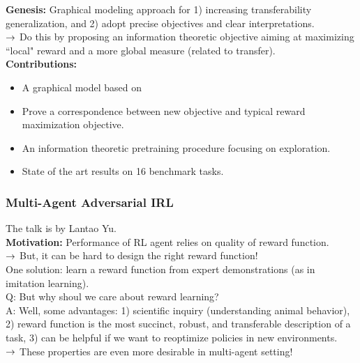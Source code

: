 {\bf Genesis:} Graphical modeling approach for 1) increasing transferability generalization, and 2) adopt precise objectives and clear interpretations. \\

$\rightarrow$ Do this by proposing an information theoretic objective aiming at maximizing ``local" reward and a more global measure (related to transfer). \\

{\bf Contributions:}
\begin{itemize}
    \item A graphical model based on
    \item Prove a correspondence between new objective and typical reward maximization objective.
    \item An information theoretic pretraining procedure focusing on exploration.
    \item State of the art results on 16 benchmark tasks.
\end{itemize}

\spacerule

\subsubsection{Multi-Agent Adversarial IRL}

The talk is by Lantao Yu. \\

{\bf Motivation:} Performance of RL agent relies on quality of reward function. \\

$\rightarrow$ But, it can be hard to design the right reward function! \\

One solution: learn a reward function from expert demonstrations (as in imitation learning). \\

Q: But why shoul we care about reward learning? \\

A: Well, some advantages: 1) scientific inquiry (understanding animal behavior), 2) reward function is the most succinct, robust, and transferable description of a task, 3) can be helpful if we want to reoptimize policies in new environments.  \\

$\rightarrow$ These properties are even more desirable in multi-agent setting! \\


